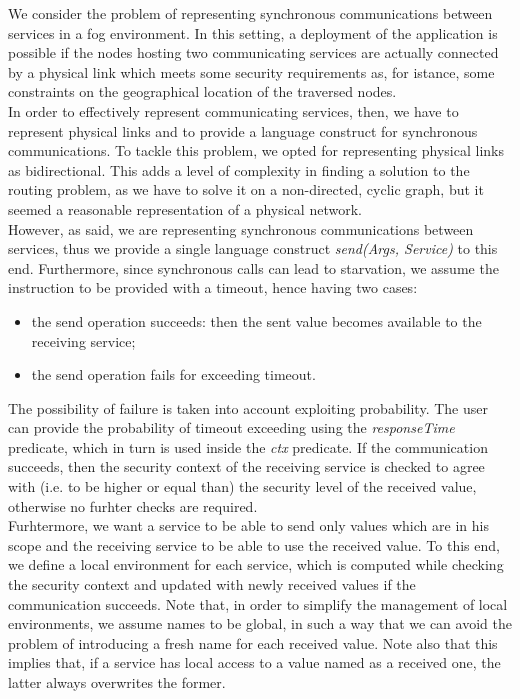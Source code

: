 \documentclass[../DraftNotes.tex]{subfiles}
\begin{document}
We consider the problem of representing synchronous communications between services in a fog environment. In this setting, a deployment of the application is possible if the nodes hosting two communicating services are actually connected by a physical link which meets some security requirements as, for istance, some constraints on the geographical location of the traversed nodes. \\
In order to effectively represent communicating services, then, we have to represent physical links and to provide a language construct for synchronous communications.
\smallskip
To tackle this problem, we opted for representing physical links as bidirectional. This adds a level of complexity in finding a solution to the routing problem, as we have to solve it on a non-directed, cyclic graph, but it seemed a reasonable representation of a physical network. \\
However, as said, we are representing synchronous communications between services, thus we provide a single language construct \emph{send(Args, Service)} to this end. Furthermore, since synchronous calls can lead to starvation, we assume the instruction to be provided with a timeout, hence having two cases:
\begin{itemize}
	\item the send operation succeeds: then the sent value becomes available to the receiving service;
	\item the send operation fails for exceeding timeout.
\end{itemize}
The possibility of failure is taken into account exploiting probability. The user can provide the probability of timeout exceeding using the \emph{responseTime} predicate, which in turn is used inside the \emph{ctx} predicate. If the communication succeeds, then the security context of the receiving service is checked to agree with (i.e. to be higher or equal than) the security level of the received value, otherwise no furhter checks are required. \\
Furhtermore, we want a service to be able to send only values which are in his scope and the receiving service to be able to use the received value. To this end, we define a local environment for each service, which is computed while checking the security context and updated with newly received values if the communication succeeds. Note that, in order to simplify the management of local environments, we assume names to be global, in such a way that we can avoid the problem of introducing a fresh name for each received value. Note also that this implies that, if a service has local access to a value named as a received one, the latter always overwrites the former.
\end{document}
